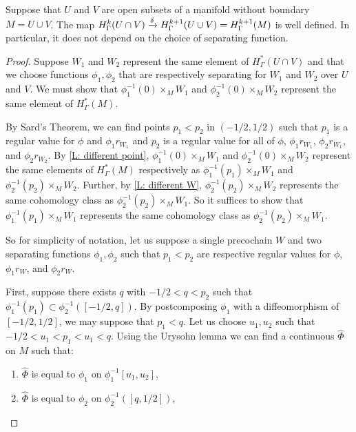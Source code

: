 \begin{proposition}\label{P: connecting}
	Suppose that $U$ and $V$ are open subsets of a manifold without boundary $M = U \cup V$.
	The map $H^k_\Gamma(U \cap V) \xrightarrow{\delta} H^{k+1}_\Gamma(U \cup V) = H^{k+1}_\Gamma(M)$ is well defined.
	In particular, it does not depend on the choice of separating function.
\end{proposition}

\begin{proof}
	Suppose $W_1$ and $W_2$ represent the same element of $H^*_\Gamma(U \cap V)$ and that we choose functions $\phi_1,\phi_2$ that are respectively separating for $W_1$ and $W_2$ over $U$ and $V$.
	We must show that $\phi_1^{-1}(0)\times_{M} W_1$ and $\phi_2^{-1}(0)\times_{M} W_2$ represent the same element of $H^*_\Gamma(M)$.

	By Sard's Theorem, we can find points $p_1<p_2$ in $(-1/2,1/2)$ such that $p_1$ is a regular value for $\phi$ and $\phi_1 r_{W_1}$ and $p_2$ is a regular value for all of $\phi$, $\phi_1 r_{W_1}$, $\phi_2 r_{W_1}$, and $\phi_2 r_{W_2}$.
	By \cref{L: different point}, $\phi_1^{-1}(0) \times_{M} W_1$ and $\phi_2^{-1}(0) \times_{M} W_2$ represent the same elements of $H^*_\Gamma(M)$ respectively as $\phi_1^{-1}(p_1) \times_{M} W_1$ and $\phi_2^{-1}(p_2) \times_{M} W_2$.
	Further, by \cref{L: different W}, $\phi_2^{-1}(p_2) \times_{M} W_2$ represents the same cohomology class as $\phi_2^{-1}(p_2) \times_{M} W_1$.
	So it suffices to show that $\phi_1^{-1}(p_1) \times_{M} W_1$ represents the same cohomology class as $\phi_2^{-1}(p_2) \times_{M} W_1$.

 	So for simplicity of notation, let us suppose a single precochain $W$ and two separating functions $\phi_1,\phi_2$ such that $p_1 < p_2$ are respective regular values for $\phi$, $\phi_1 r_W$, and $\phi_2 r_W$.

	First, suppose there exists $q$ with $-1/2<q<p_2$ such that $\phi_1^{-1}(p_1) \subset \phi_2^{-1}([-1/2,q])$.
	By postcomposing $\phi_1$ with a diffeomorphism of $[-1/2,1/2]$, we may suppose that $p_1<q$.
	Let us choose $u_1,u_2$ such that $-1/2<u_1<p_1<u_1<q$.
	Using the Urysohn lemma we can find a continuous $\hat \Phi$ on $M$ such that:

	\begin{enumerate}
		\item $\hat \Phi$ is equal to $\phi_1$ on $\phi_1^{-1}[u_1,u_2]$,
		\item $\hat\Phi$ is equal to $\phi_2$ on $\phi_2^{-1}([q,1/2])$,


\end{enumerate}
\end{proof}
